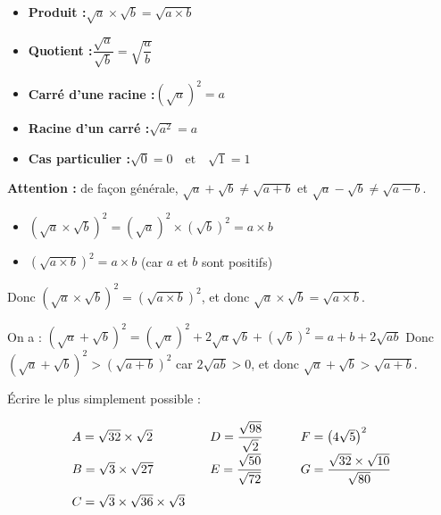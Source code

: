 \begin{prop}
	\begin{itemize}[itemsep=3mm]
		\item \textbf{Produit :}\qquad $\sqrt{a} \times \sqrt{b} = \sqrt{a \times b}$
		\item \textbf{Quotient :}\qquad $\dfrac{\sqrt{a}}{\sqrt{b}} = \sqrt{\dfrac{a}{b}}$
		\item \textbf{Carré d'une racine :}\qquad $\left( \sqrt{a} \right)^2 = a$
		\item \textbf{Racine d'un carré :}\qquad $\sqrt{a^2} = a$
		\item \textbf{Cas particulier :}\qquad $\sqrt{0} = 0 \quad \text{et} \quad \sqrt{1} = 1$
	\end{itemize}

	\textbf{Attention :} de façon générale, $\sqrt{a} + \sqrt{b} \neq \sqrt{a + b}$ et $\sqrt{a} - \sqrt{b} \neq \sqrt{a - b}$.
\end{prop}

\begin{demo}[$\sqrt{a} \times \sqrt{b} = \sqrt{a \times b}$]
	\begin{itemize}
		\item $\left( \sqrt{a} \times \sqrt{b} \right)^2 = \left( \sqrt{a} \right)^2 \times \left( \sqrt{b} \right)^2 = a \times b$
		\item $\left( \sqrt{a \times b} \right)^2 = a \times b$ \quad (car $a$ et $b$ sont positifs)
	\end{itemize}
	Donc $\left( \sqrt{a} \times \sqrt{b} \right)^2 = \left( \sqrt{a \times b} \right)^2$, et donc $\sqrt{a} \times \sqrt{b} = \sqrt{a \times b}$.
\end{demo}

\begin{demo}
	On a : $\left( \sqrt{a} + \sqrt{b} \right)^2 = \left( \sqrt{a} \right)^2 + 2\sqrt{a}\sqrt{b} + \left( \sqrt{b} \right)^2 = a + b + 2\sqrt{ab}$ Donc $\left( \sqrt{a} + \sqrt{b} \right)^2 > \left( \sqrt{a + b} \right)^2$ car $2\sqrt{ab} > 0$, et donc $\sqrt{a} + \sqrt{b} > \sqrt{a + b}$.
\end{demo}

\begin{methode}
	Écrire le plus simplement possible :

	\[
		\def\arraystretch{2} \begin{array}{lllllll}
			A = \sqrt{32} \times \sqrt{2} \quad & \quad D = \dfrac{\sqrt{98}}{\sqrt{2}} \quad & \quad F = \left( 4\sqrt{5} \right)^2                    \\
			B = \sqrt{3} \times \sqrt{27} \quad & \quad E = \dfrac{\sqrt{50}}{\sqrt{72}}\quad & \quad G = \dfrac{\sqrt{32} \times \sqrt{10}}{\sqrt{80}} \\
			C = \sqrt{3} \times \sqrt{36} \times \sqrt{3}
		\end{array}
	\]

\end{methode}

